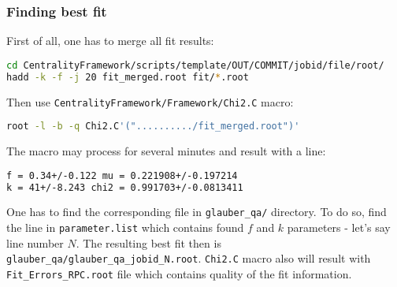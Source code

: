 \documentclass[11pt]{article}
\begin{document}
\subsubsection{Finding best fit}
First of all, one has to merge all fit results:
\begin{lstlisting}[language=bash,caption={}]
cd CentralityFramework/scripts/template/OUT/COMMIT/jobid/file/root/
hadd -k -f -j 20 fit_merged.root fit/*.root
\end{lstlisting}
%
Then use \texttt{CentralityFramework/Framework/Chi2.C} macro:
\begin{lstlisting}[language=bash,caption={}]
root -l -b -q Chi2.C'("........../fit_merged.root")'
\end{lstlisting}
%
The macro may process for several minutes and result with a line: 
\begin{lstlisting}[language=bash,caption={}]
f = 0.34+/-0.122 mu = 0.221908+/-0.197214 
k = 41+/-8.243 chi2 = 0.991703+/-0.0813411
\end{lstlisting}
%
One has to find the corresponding file in \texttt{glauber\_qa/} directory.
To do so, find the line in \texttt{parameter.list} which contains found $f$ and $k$ parameters - let's say line number $N$.
The resulting best fit then is \texttt{glauber\_qa/glauber\_qa\_jobid\_N.root}.
\texttt{Chi2.C} macro also will result with \texttt{Fit\_Errors\_RPC.root} file which contains quality of the fit information.
\end{document}
